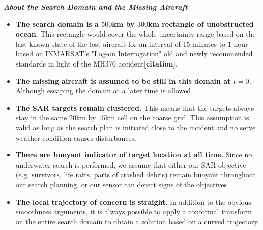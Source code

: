 \documentclass[12pt, letterpaper]{article}  %
\theoremstyle{definition}
\theoremstyle{remark}
\theoremstyle{plain}
\begin{document}
\textit{\textbf{About the Search Domain and the Missing Aircraft}}
\begin{itemize}
\item \textbf{The search domain is a $500$km by $300$km rectangle of unobstructed ocean.} This rectangle would cover the whole uncertainty range based on 
the last known state of the lost aircraft for an interval of 15 minutes to 1 hour based on INMARSAT's "Log-on Interrogation" old and newly recommended standards in light of the MH370 accident\textbf{[citation]}.
\item \textbf{The missing aircraft is assumed to be still in this domain at $t=0$.} Although escaping the domain at a later time is allowed.
\item \textbf{The SAR targets remain clustered.} This means that the targets always stay in the same $20$km by $15$km cell on the coarse grid. This assumption is valid as long as the search plan is initiated close to the incident and no serve weather condition causes disturbances.
\item \textbf{There are buoyant indicator of target location at all time.} Since no underwater search is performed, we assume that either our SAR objective (e.g. survivors, life rafts, parts of crashed debris) remain buoyant throughout our search planning, or our sensor can detect signs of the objectives 
\item \textbf{The local trajectory of concern is straight}. In addition to the obvious smoothness arguments, it is always possible to apply a conformal transform on the entire search domain to obtain a solution based on a curved trajectory.


\end{itemize}
\end{document}
